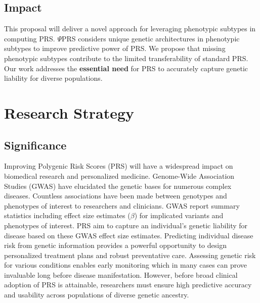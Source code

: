 \documentclass[11pt]{article}  %
\begin{document}
\subsection*{Impact}
This proposal will deliver a novel approach for leveraging phenotypic subtypes in computing PRS. $\Psi$PRS considers unique genetic architectures in phenotypic subtypes to improve predictive power of PRS. We propose that missing phenotypic subtypes contribute to the limited transferability of standard PRS. Our work addresses the \textbf{essential need} for PRS to accurately capture genetic liability for diverse populations.         

\newpage
\section*{Research Strategy}

\subsection*{Significance}





Improving Polygenic Risk Scores (PRS) will have a widespread impact on biomedical research and personalized medicine. Genome-Wide Association Studies (GWAS) have elucidated the genetic bases for numerous complex diseases. Countless associations have been made between genotypes and phenotypes of interest to researchers and clinicians. GWAS report summary statistics including effect size estimates ($\beta$) for implicated variants and phenotypes of interest. PRS aim to capture an individual's genetic liability for disease based on these GWAS effect size estimates. Predicting individual disease risk from genetic information provides a powerful opportunity to design personalized treatment plans and robust preventative care. Assessing genetic risk for various conditions enables early monitoring which in many cases can prove invaluable long before disease manifestation. However, before broad clinical adoption of PRS is attainable, researchers must ensure high predictive accuracy and usability across populations of diverse genetic ancestry.
\end{document}
